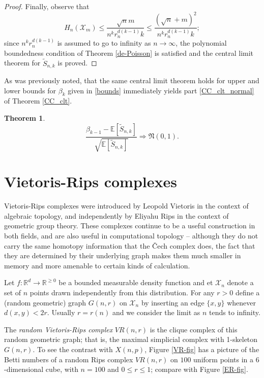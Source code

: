 \documentclass{amsart}
\newtheorem{thm}{Theorem}[section]
\theoremstyle{definition}
\newcommand{\E}{\mathbb{E}}
\newcommand{\X}{\mathcal{X}}
\newcommand{\s}{\widetilde{S}}
\renewcommand{\1}{\mathbb{1}}
\begin{document}
\begin{proof}
Finally, observe that 
$$H_n(\X_m)\le\frac{\sqrt{n}m}{n^kr_n^{d(k-1)}k}\le\frac{(\sqrt{n}+m)^2}{n^kr_n^{d(k-1)}k};$$
since $n^kr_n^{d(k-1)}$ is assumed to go to infinity as $n\to\infty$, 
the polynomial boundedness condition of Theorem \ref{de-Poisson}
is satisfied
and the  central limit theorem for 
$\s_{n,k}$ is proved.

\end{proof}

\bigskip

As was previously noted, that the same central limit theorem holds for 
upper and lower bounds for $\beta_k$ given in \eqref{bounds}
immediately yields part \ref{CC_clt_normal}
of Theorem \ref{CC_clt}.

\begin{thm}\label{betti-normal}
$$\frac{\beta_{k-1}-\E[\s_{n,k}]}{\sqrt{\E[\s_{n,k}]}}\Longrightarrow
\mathfrak{N}(0,1).$$
\end{thm}

\section{Vietoris-Rips complexes}

Vietoris-Rips complexes were introduced by Leopold Vietoris in the
context of algebraic topology, and independently by Eliyahu Rips in
the context of geometric group theory.  These complexes continue to be
a useful construction in both fields, and are also useful in
computational topology -- although they do not carry the same homotopy
information that the \v{C}ech complex does, the fact that they are
determined by their underlying graph makes them much smaller in memory
and more amenable to certain kinds of calculation. %

Let $f: \mathbb{R}^d \to \mathbb{R}^{\ge 0}$ be a bounded measurable
density function and  et $\mathcal{X}_n$ denote a
set of $n$ points drawn independently from this distribution.  For any
$r>0$ define a (random geometric) graph $G(n,r)$ 
on $\mathcal{X}_n$ by inserting an edge $\{x,y\}$
whenever $d(x,y) < 2r$.  Usually 
$r=r(n)$ and we consider the limit
as $n$ tends to infinity.

The {\it random Vietoris-Rips complex} $VR (n,r)$ is the clique
complex of this random geometric graph; that is, the maximal 
simplicial complex with 1-skeleton $G(n,r)$. 
To see the contrast with $X(n,p)$, Figure \ref{VR-fig} 
has a picture of the Betti numbers of a random Rips
complex $VR(n,r)$ on $100$ uniform points in a $6$-dimensional cube,
with $n=100$ and $0 \le r \le 1$; compare with Figure \ref{ER-fig}.
\end{document}
